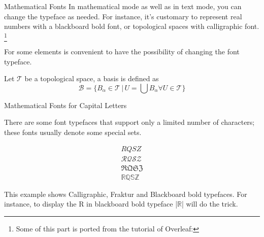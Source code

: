 \begin{frame}[fragile]{Mathematical Fonts}
In mathematical mode as well as in text mode, you can change the typeface as needed. For instance, it's customary to represent real numbers with a blackboard bold font, or topological spaces with calligraphic font. \footnote[1]{Some of this part is ported from the tutorial of Overleaf: }\medskip

For some elements is convenient to have the possibility of changing the font typeface.

\begin{latexexample}
Let \( \mathcal{T} \) be a topological space, a basis is defined as
\[ \mathcal{B} = \{B_{\alpha} \in \mathcal{T}\, |\,  
   U = \bigcup B_{\alpha} \forall U \in \mathcal{T} \} \]
\end{latexexample}

\end{frame}

\begin{frame}[fragile]{Mathematical Fonts for Capital Letters}

There are some font typefaces that support only a limited number of characters; these fonts usually denote some special sets.

\begin{latexexamplesplit}
\begin{gather*}
  RQSZ \\
  \mathcal{RQSZ} \\
  \mathfrak{RQSZ} \\
  \mathbb{RQSZ}
\end{gather*}
\end{latexexamplesplit}

This example shows Calligraphic, Fraktur and Blackboard bold typefaces. For instance, to display the R in blackboard bold typeface \LC|$\mathbb{R}$| will do the trick.

\end{frame}

